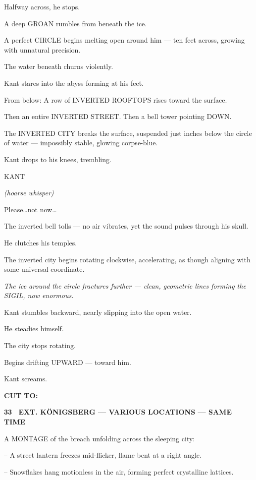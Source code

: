 \documentclass[12pt]{article}
\newcommand{\scene}[2]{%
  \vspace{1.8\baselineskip}%
  \noindent\textbf{#1 \ #2}\par\vspace{0.4\baselineskip}%
}
\newenvironment{dialogue}[1]{%
  \vspace{0.8\baselineskip}%
  \noindent\hspace*{2.3in}\textsc{#1}\par%
  \noindent\hspace*{1.5in}\begin{minipage}[t]{4.5in}%
}{%
  \end{minipage}\par%
}
\newcommand{\paren}[1]{%
  \noindent\hspace*{1.8in}\textit{(#1)}\par%
}
\newcommand{\transition}[1]{%
  \vspace{0.6\baselineskip}%
  \begin{flushright}\textbf{#1}\end{flushright}%
}
\begin{document}
Halfway across, he stops.

A deep GROAN rumbles from beneath the ice.

A perfect CIRCLE begins melting open around him — ten feet across,
growing with unnatural precision.

The water beneath churns violently.

Kant stares into the abyss forming at his feet.

From below:  
A row of INVERTED ROOFTOPS rises toward the surface.

Then an entire INVERTED STREET.  
Then a bell tower pointing DOWN.

The INVERTED CITY breaks the surface, suspended just inches below the
circle of water — impossibly stable, glowing corpse-blue.

Kant drops to his knees, trembling.

\begin{dialogue}{KANT}
\paren{hoarse whisper}
Please\ldots not now\ldots
\end{dialogue}

The inverted bell tolls — no air vibrates, yet the sound pulses through
his skull.

He clutches his temples.

The inverted city begins rotating clockwise, accelerating, as though
aligning with some universal coordinate.

\textit{The ice around the circle fractures further — clean, geometric
lines forming the SIGIL, now enormous.}

Kant stumbles backward, nearly slipping into the open water.

He steadies himself.

The city stops rotating.

Begins drifting UPWARD — toward him.

Kant screams.

\transition{CUT TO:}


\scene{33}{EXT. KÖNIGSBERG — VARIOUS LOCATIONS — SAME TIME}

A MONTAGE of the breach unfolding across the sleeping city:

-- A street lantern freezes mid-flicker, flame bent at a right angle.

-- Snowflakes hang motionless in the air, forming perfect crystalline
lattices.
\end{document}

